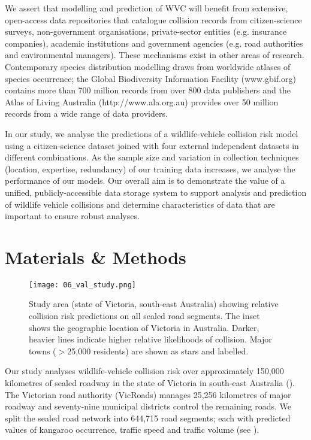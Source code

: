 We assert that modelling and prediction of WVC will benefit from extensive, open-access data repositories that catalogue collision records from citizen-science surveys, non-government organisations, private-sector entities (e.g. insurance companies), academic institutions and government agencies (e.g. road authorities and environmental managers). These mechanisms exist in other areas of research. Contemporary species distribution modelling draws from worldwide atlases of species occurrence; the Global Biodiversity Information Facility (www.gbif.org) contains more than 700 million records from over 800 data publishers and the Atlas of Living Australia (http://www.ala.org.au) provides over 50 million records from a wide range of data providers.

In our study, we analyse the predictions of a wildlife-vehicle collision risk model using a citizen-science dataset joined with four external independent datasets in different combinations. As the sample size and variation in collection techniques (location, expertise, redundancy) of our training data increases, we analyse the performance of our models. Our overall aim is to demonstrate the value of a unified, publicly-accessible data storage system to support analysis and prediction of wildlife vehicle collisions and determine characteristics of data that are important to ensure robust analyses.

\section{Materials \& Methods}

\begin{figure*}[htp]
  \centering
  \texttt{[image: 06\_val\_study.png]}
  \caption[Wildlife-vehicle collision predictions in Victoria]{Study area (state of Victoria, south-east Australia) showing relative collision risk predictions on all sealed road segments. The inset shows the geographic location of Victoria in Australia. Darker, heavier lines indicate higher relative likelihoods of collision. Major towns ($>$25,000 residents) are shown as stars and labelled.}
  \label{val_study_area}
\end{figure*}

Our study analyses wildlife-vehicle collision risk over approximately 150,000 kilometres of sealed roadway in the state of Victoria in south-east Australia (). The Victorian road authority (VicRoads) manages 25,256 kilometres of major roadway and seventy-nine municipal districts control the remaining roads. We split the sealed road network into 644,715 road segments; each with predicted values of kangaroo occurrence, traffic speed and traffic volume (see ).

